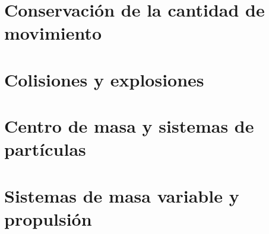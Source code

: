﻿\documentclass[11pt,letterpaper,openany]{book}
\newcommand{\rutaraiz}{../..}
\begin{document}




\chapter{Conservación de la cantidad de movimiento}





\chapter{Colisiones y explosiones}





\chapter{Centro de masa y sistemas de partículas}





\chapter{Sistemas de masa variable y propulsión}




\end{document}
